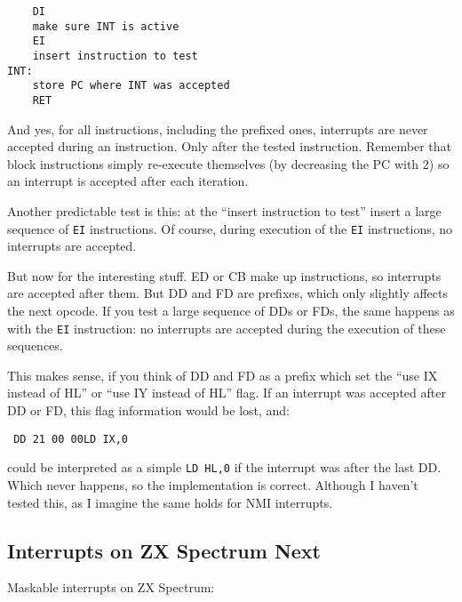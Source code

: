 \documentclass[twoside,openright,a4paper]{book}
\begin{document}
\begin{Verbatim}
	DI
	make sure INT is active
	EI
	insert instruction to test
INT:
	store PC where INT was accepted
	RET
\end{Verbatim}

And yes, for all instructions, including the prefixed ones, interrupts are never accepted during an instruction. Only after the tested instruction. Remember that block instructions simply re-execute themselves (by decreasing the PC with 2) so an interrupt is accepted after each iteration.

Another predictable test is this: at the ``insert instruction to test'' insert a large sequence of {\tt EI} instructions. Of course, during execution of the {\tt EI} instructions, no interrupts are accepted. 

But now for the interesting stuff. ED or CB make up instructions, so interrupts are accepted after them. But DD and FD are prefixes, which only slightly affects the next opcode. If you test a large sequence of DDs or FDs, the same happens as with the {\tt EI} instruction: no interrupts are accepted during the execution of these sequences.

This makes sense, if you think of DD and FD as a prefix which set the ``use IX instead of HL'' or ``use IY instead of HL'' flag. If an interrupt was accepted after DD or FD, this flag information would be lost, and:

{\tt 
	{\qquad}DD 21 00 00{\qquad}LD IX,0
}

could be interpreted as a simple {\tt LD HL,0} if the interrupt was after the last DD. Which never happens, so the implementation is correct. Although I haven't tested this, as I imagine the same holds for NMI interrupts.


\subsection{Interrupts on ZX Spectrum Next}

Maskable interrupts on ZX Spectrum:
\end{document}
